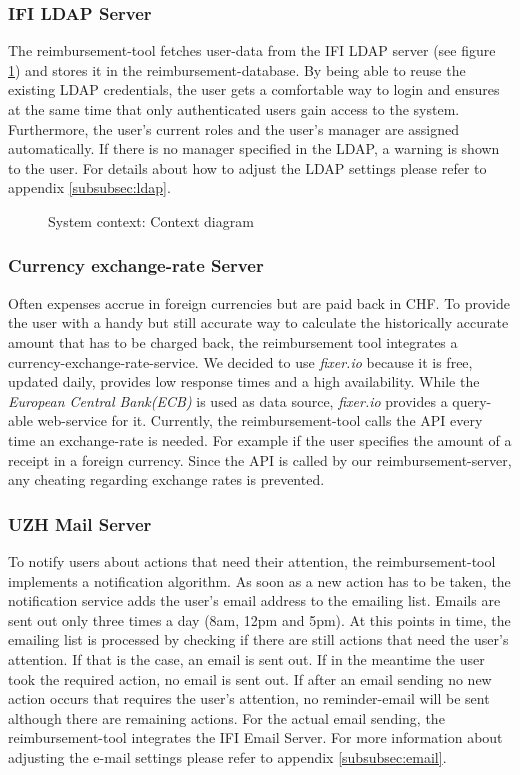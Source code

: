 \subsubsection{IFI LDAP Server}
The reimbursement-tool fetches user-data from the IFI LDAP server (see figure \ref{fig:context-diagram}) and stores it in the reimbursement-database. By being able to reuse the existing LDAP credentials, the user gets a comfortable way to login and ensures at the same time that only authenticated users gain access to the system. Furthermore, the user's current roles and the user's manager are assigned automatically. If there is no manager specified in the LDAP, a warning is shown to the user. For details about how to adjust the LDAP settings please refer to appendix \ref{subsubsec:ldap}.

\begin{figure}[H]
    \centering
    \caption{System context: Context diagram}
    \label{fig:context-diagram}
\end{figure}

\subsubsection{Currency exchange-rate Server}
Often expenses accrue in foreign currencies but are paid back in CHF. To provide the user with a handy but still accurate way to calculate the historically accurate amount that has to be charged back, the reimbursement tool integrates a currency-exchange-rate-service. We decided to use \textit{fixer.io} \cite{fixer} because it is free, updated daily, provides low response times and a high availability. While the \textit{European Central Bank(ECB)}\cite{ecb} is used as data source, \textit{fixer.io} provides a query-able web-service for it. Currently, the reimbursement-tool calls the API every time an exchange-rate is needed. For example if the user specifies the amount of a receipt in a foreign currency. Since the API is called by our reimbursement-server, any cheating regarding exchange rates is prevented.

\subsubsection{UZH Mail Server}
To notify users about actions that need their attention, the reimbursement-tool implements a notification algorithm. As soon as a new action has to be taken, the notification service adds the user's email address to the emailing list. Emails are sent out only three times a day (8am, 12pm and 5pm). At this points in time, the emailing list is processed by checking if there are still actions that need the user's attention. If that is the case, an email is sent out. If in the meantime the user took the required action, no email is sent out. If after an email sending no new action occurs that requires the user's attention, no reminder-email will be sent although there are remaining actions. For the actual email sending, the reimbursement-tool integrates the IFI Email Server. For more information about adjusting the e-mail settings please refer to appendix \ref{subsubsec:email}.

